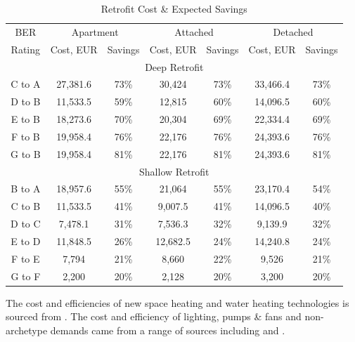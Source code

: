 \documentclass[gmd,manuscript]{copernicus}
\begin{document}
\begin{table}[ht]
 \centering
 \footnotesize
 \caption{Retrofit Cost \& Expected Savings}
 \begin{tabular}{ccccccc}
 \hline
 BER & \multicolumn{2}{c}{Apartment} & \multicolumn{2}{c}{Attached} & \multicolumn{2}{c}{Detached} \\ 
 Rating & Cost, EUR & Savings & Cost, EUR & Savings & Cost, EUR & Savings \\
 \hline
 \multicolumn{7}{c}{Deep Retrofit} \\
 \hline
 C to A & 27,381.6 & 73\% & 30,424 & 73\% & 33,466.4 & 73\% \\
 D to B	& 11,533.5 & 59\% & 12,815 & 60\% & 14,096.5 & 60\% \\
 E to B & 18,273.6 & 70\% & 20,304 & 69\% & 22,334.4 & 69\% \\
 F to B & 19,958.4 & 76\% & 22,176 & 76\% & 24,393.6 & 76\% \\
 G to B & 19,958.4 & 81\% & 22,176 & 81\% & 24,393.6 & 81\% \\
 \hline
 \multicolumn{7}{c}{Shallow Retrofit} \\[0.5ex]
 \hline
 B to A & 18,957.6 & 55\% & 21,064 & 55\% & 23,170.4 & 54\% \\
 C to B & 11,533.5 & 41\% & 9,007.5 & 41\% & 14,096.5 & 40\% \\
 D to C & 7,478.1 & 31\% & 7,536.3 & 32\% & 9,139.9 & 32\% \\
 E to D & 11,848.5 & 26\% & 12,682.5 & 24\% & 14,240.8 & 24\% \\
 F to E & 7,794 & 21\% & 8,660 & 22\% & 9,526 & 21\% \\
 G to F & 2,200 & 20\% & 2,128 & 20\% & 3,200 & 20\% \\ \hline
 \end{tabular}
 
 \label{Retrofit Expected Savings}
\end{table}

The cost and efficiencies of new space heating and water heating technologies is sourced from \citet{DEA2020}. The cost and efficiency of lighting, pumps \& fans and non-archetype demands came from a range of sources including
\citet{SEAISustainableAuthorityofIreland2018} and \citet{ecotopten}.
\end{document}
